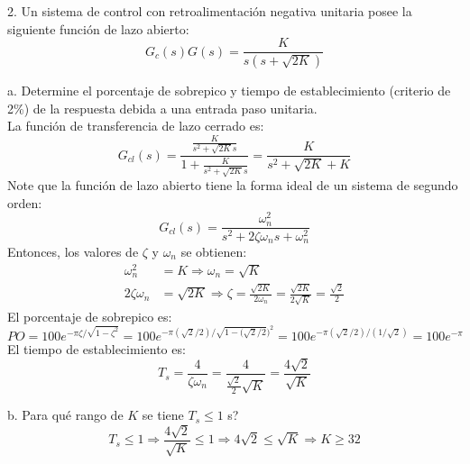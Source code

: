 \documentclass[11pt, spanish]{article}
\begin{document}
\begin{description}
			\item 2. Un sistema de control con retroalimentación negativa unitaria posee la siguiente función de lazo abierto:
			\begin{equation*}
				G_c(s)G(s) = \frac{K}{s(s+\sqrt{2K})}
			\end{equation*}
			\begin{description}
				\item a. Determine el porcentaje de sobrepico y tiempo de establecimiento (criterio de 2\%) de la respuesta debida a una entrada paso unitaria.\\
				La función de transferencia de lazo cerrado es:
				\begin{equation*}
					G_{cl}(s) = \frac{\frac{K}{s^2+\sqrt{2K}s}}{1+\frac{K}{s^2+\sqrt{2K}s}} = \frac{K}{s^2+\sqrt{2K}+K}
				\end{equation*}
				Note que la función de lazo abierto tiene la forma ideal de un sistema de segundo orden:
				\begin{equation*}
					G_{cl}(s) = \frac{\omega_n^2}{s^2 + 2\zeta \omega_n s + \omega_n^2}
				\end{equation*}
				Entonces, los valores de $\zeta$ y $\omega_n$ se obtienen:
				\begin{align*}
					\omega_n^2 &= K \Rightarrow \omega_n = \sqrt{K}\\
					2\zeta \omega_n &= \sqrt{2K} \Rightarrow \zeta = \frac{\sqrt{2K}}{2\omega_n} = \frac{\sqrt{2K}}{2\sqrt{K}} = \frac{\sqrt{2}}{2}
				\end{align*}
				El porcentaje de sobrepico es:
				\begin{equation*}
					PO = 100e^{-\pi \zeta/\sqrt{1-\zeta^2}} = 100e^{-\pi (\sqrt{2}/2) / \sqrt{1-(\sqrt{2}/2})^2} = 100e^{-\pi (\sqrt{2}/2) / (1/\sqrt{2})} = 100e^{-\pi}
				\end{equation*}
				El tiempo de establecimiento es:
				\begin{equation*}
					T_s = \frac{4}{\zeta \omega_n} = \frac{4}{\frac{\sqrt{2}}{2}\sqrt{K}} = \frac{4\sqrt{2}}{\sqrt{K}}
				\end{equation*}

				\item b. Para qué rango de $K$ se tiene $T_s \leq 1$ s?\\
				\begin{equation*}
					T_s \leq 1 \Rightarrow \frac{4\sqrt{2}}{\sqrt{K}} \leq 1 \Rightarrow 4\sqrt{2} \leq \sqrt{K} \Rightarrow K \geq 32
				\end{equation*}
			\end{description}
			

\end{description}
\end{document}
